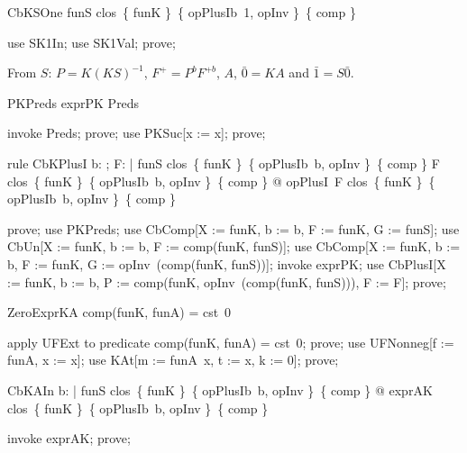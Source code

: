 \documentclass{article}
\begin{document}
\begin{theorem}{CbKSOne}
  funS \in clos~\{ funK \}~\{ opPlusIb~1, opInv \}~\{ comp \}
\end{theorem}

\begin{zproof}
use SK1In;
use SK1Val;
prove;
\end{zproof}

From $S$: $P = K (K S)^{-1}$, $F^+ = P^b F^{+b}$, $A$, $\bar 0 = K A$ and $\bar 1 = S \bar 0$.

\begin{theorem}{PKPreds}
  exprPK \in Preds
\end{theorem}

\begin{zproof}
invoke Preds;
prove;
use PKSuc[x := x];
prove;
\end{zproof}

\begin{theorem}{rule CbKPlusI}
  \forall b: \nat; F: \nat \fun \nat | funS \in clos~\{ funK \}~\{ opPlusIb~b, opInv \}~\{ comp \} \land F \in clos~\{ funK \}~\{ opPlusIb~b, opInv \}~\{ comp \} @ opPlusI~F \in clos~\{ funK \}~\{ opPlusIb~b, opInv \}~\{ comp \}
\end{theorem}

\begin{zproof}
prove;
use PKPreds;
use CbComp[X := funK, b := b, F := funK, G := funS];
use CbUn[X := funK, b := b, F := comp(funK, funS)];
use CbComp[X := funK, b := b, F := funK, G := opInv~(comp(funK, funS))];
invoke exprPK;
use CbPlusI[X := funK, b := b, P := comp(funK, opInv~(comp(funK, funS))), F := F];
prove;
\end{zproof}

\begin{theorem}{ZeroExprKA}
  comp(funK, funA) = cst~0
\end{theorem}

\begin{zproof}
apply UFExt to predicate comp(funK, funA) = cst~0;
prove;
use UFNonneg[f := funA, x := x];
use KAt[m := funA~x, t := x, k := 0];
prove;
\end{zproof}

\begin{theorem}{CbKAIn}
  \forall b: \nat | funS \in clos~\{ funK \}~\{ opPlusIb~b, opInv \}~\{ comp \} @ exprAK \in clos~\{ funK \}~\{ opPlusIb~b, opInv \}~\{ comp \}
\end{theorem}

\begin{zproof}
invoke exprAK;
prove;
\end{zproof}
\end{document}
